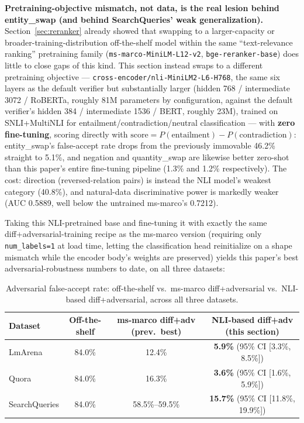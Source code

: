 \documentclass[11pt]{article}
\newenvironment{fittab}{\begin{lrbox}{\fittabbox}}{\end{lrbox}%
  \ifdim\wd\fittabbox>\linewidth\resizebox{\linewidth}{!}{\usebox{\fittabbox}}\else\usebox{\fittabbox}\fi}
\begin{document}
\textbf{Pretraining-objective mismatch, not data, is the real lesion behind entity\_swap (and behind SearchQueries' weak generalization).} Section~\ref{sec:reranker} already showed that swapping to a larger-capacity or broader-training-distribution off-the-shelf model within the same ``text-relevance ranking'' pretraining family (\texttt{ms-marco-Mini\allowbreak{}LM-L12-v2}, \texttt{bge-reranker-base}) does little to close gaps of this kind. This section instead swaps to a different pretraining objective --- \texttt{cross-encoder/\allowbreak{}nli-Mini\allowbreak{}LM2-L6-H768}, the same six layers as the default verifier but substantially larger (hidden 768 / intermediate 3072 / RoBERTa, roughly 81M parameters by configuration, against the default verifier's hidden 384 / intermediate 1536 / BERT, roughly 23M), trained on SNLI+MultiNLI for entailment/contradiction/neutral classification --- with \textbf{zero fine-tuning}, scoring directly with $\text{score} = P(\text{entailment}) - P(\text{contradiction})$: entity\_swap's false-accept rate drops from the previously immovable 46.2\% straight to 5.1\%, and negation and quantity\_swap are likewise better zero-shot than this paper's entire fine-tuning pipeline (1.3\% and 1.2\% respectively). The cost: direction (reversed-relation pairs) is instead the NLI model's weakest category (40.8\%), and natural-data discriminative power is markedly weaker (AUC 0.5889, well below the untrained ms-marco's 0.7212).

Taking this NLI-pretrained base and fine-tuning it with exactly the same diff+adversarial-training recipe as the ms-marco version (requiring only \texttt{num\_\allowbreak{}labels=1} at load time, letting the classification head reinitialize on a shape mismatch while the encoder body's weights are preserved) yields this paper's best adversarial-robustness numbers to date, on all three datasets:

\begin{table}[h]
\centering
\small
\begin{fittab}\begin{tabular}{@{}lccc@{}}
\toprule
\textbf{Dataset} & \textbf{Off-the-shelf} & \textbf{ms-marco diff+adv (prev.\ best)} & \textbf{NLI-based diff+adv (this section)} \\
\midrule
LmArena & 84.0\% & 12.4\% & \textbf{5.9\%} (95\% CI [3.3\%, 8.5\%]) \\
Quora & 84.0\% & 16.3\% & \textbf{3.6\%} (95\% CI [1.6\%, 5.9\%]) \\
SearchQueries & 84.0\% & 58.5\%--59.5\% & \textbf{15.7\%} (95\% CI [11.8\%, 19.9\%]) \\
\bottomrule
\end{tabular}\end{fittab}
\caption{Adversarial false-accept rate: off-the-shelf vs.\ ms-marco diff+adversarial vs.\ NLI-based diff+adversarial, across all three datasets.}
\end{table}
\end{document}
